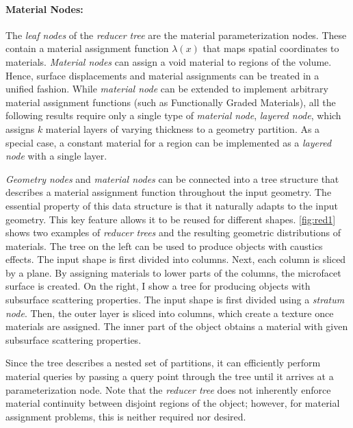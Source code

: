 \paragraph{Material Nodes:} The \emph{leaf nodes} of the \emph{reducer tree} are the material parameterization nodes. These contain a material assignment function $\lambda\left(x\right)$ that maps spatial coordinates to materials. \emph{Material nodes} can assign a void material to regions of the volume. Hence, surface displacements and material assignments can be treated in a unified fashion.
While \emph{material node} can be extended to implement arbitrary material assignment functions (such as Functionally Graded Materials), all the following results require only a single type of \emph{material node}, \emph{layered node}, which assigns $k$ material layers of varying thickness to a geometry partition.
As a special case, a constant material for a region can be implemented as a \emph{layered node} with a single layer.

\emph{Geometry nodes} and \emph{material nodes} can be connected into a tree structure that describes a material assignment function throughout the input geometry. 
The essential property of this data structure is that it naturally adapts to the input geometry. This key feature allows it to be reused for different shapes.
\autoref{fig:red1} shows two examples of \emph{reducer trees} and the resulting geometric distributions of materials.
The tree on the left can be used to produce objects with caustics effects.
The input shape is first divided into columns. Next, each column is sliced by a plane.
By assigning materials to lower parts of the columns, the microfacet surface is created.
On the right, I show a tree for producing objects with subsurface scattering properties.
The input shape is first divided using a \emph{stratum node}. Then, the outer layer is sliced into columns, which create a texture once materials are assigned. The inner part of the object obtains a material with given subsurface scattering properties.

Since the tree describes a nested set of partitions, it can efficiently perform material queries by passing a query point through the tree until it arrives at a parameterization node. 
Note that the \emph{reducer tree} does not inherently enforce material continuity between disjoint regions of the object; however, for material assignment problems, this is neither required nor desired. 

